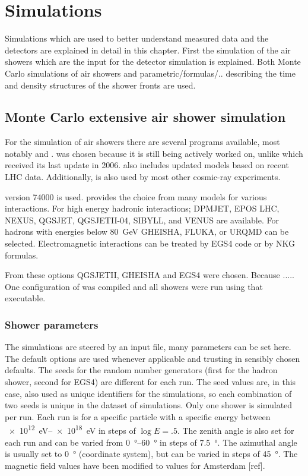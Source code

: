 \chapter{Simulations}
\label{ch:simulations}

Simulations which are used to better understand measured data and the detectors are explained in detail in this chapter. First the simulation of the air showers which are the input for the detector simulation is explained. Both Monte Carlo simulations of air showers and parametric/formulas/.. describing the time and density structures of the shower fronts are used.


\section{Monte Carlo extensive air shower simulation}

For the simulation of air showers there are several programs available,
most notably \corsika and \aires. \corsika was chosen because it is still
being actively worked on, unlike \aires which received its last update in
2006. \corsika also includes updated models based on recent LHC data.
Additionally, \corsika is also used by most other cosmic-ray
experiments.

\corsika version 74000 is used. \corsika provides the choice from many
models for various interactions. For high energy hadronic interactions;
DPMJET, EPOS LHC\cite{pierog2013}, NEXUS, QGSJET,
QGSJETII-04\cite{ostapchenko2013}, SIBYLL, and VENUS are
available. For hadrons with energies below \SI{80}{\giga\electronvolt}
GHEISHA\cite{fesefeldt1985}, FLUKA, or URQMD can be
selected. Electromagnetic interactions can be treated by EGS4\cite{egs4}
code or by NKG formulas.

From these options QGSJETII, GHEISHA and EGS4 were chosen. Because ..... One configuration of \corsika was compiled and all showers were run using that executable.


\subsection{Shower parameters}

The simulations are steered by an input file, many parameters can be set
here. The default options are used whenever applicable and trusting in
sensibly chosen defaults. The seeds for the random number generators
(first for the hadron shower, second for EGS4) are different for each
run. The seed values are, in this case, also used as unique identifiers for the
simulations, so each combination of two seeds is unique in the dataset of
simulations. Only one shower is simulated per run. Each run is for a
specific particle with a specific energy between
\SIrange{e12}{e18}{\electronvolt} in steps of $\log E = .5$.
The zenith angle is also set for each run and can be varied from
\SIrange{0}{60}{\degree} in steps of \SI{7.5}{\degree}. The azimuthal
angle is usually set to \SI{0}{\degree} (\hisparc coordinate system), but can be varied in steps of \SI{45}{\degree}. The magnetic field values have been modified to values for Amsterdam [ref].

